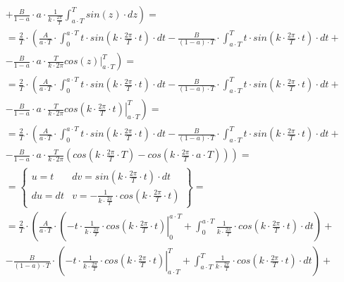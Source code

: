 \begin{task}
\begin{align*}
&+\left. \frac{B}{1-a}\cdot a \cdot \frac{1}{k \cdot \frac{2\pi}{T}} \int_{a \cdot T}^{T} sin\left(z\right) \cdot dz\right)=\\
&=\frac{2}{T}\cdot\left( \frac{A}{a \cdot T} \cdot \int_{0}^{a\cdot T} t \cdot sin\left( k \cdot \frac{2\pi}{T} \cdot t\right) \cdot dt -\frac{B}{\left(1-a\right)\cdot T}\cdot \int_{a \cdot T}^{T} t \cdot sin\left( k \cdot \frac{2\pi}{T} \cdot t\right) \cdot dt \right. +\\
&-\left. \frac{B}{1-a}\cdot a \cdot \frac{T}{k \cdot 2\pi} \left. cos\left(z\right) \right|_{a \cdot T}^{T}\right)=\\
&=\frac{2}{T}\cdot\left( \frac{A}{a \cdot T} \cdot \int_{0}^{a\cdot T} t \cdot sin\left( k \cdot \frac{2\pi}{T} \cdot t\right) \cdot dt -\frac{B}{\left(1-a\right)\cdot T}\cdot \int_{a \cdot T}^{T} t \cdot sin\left( k \cdot \frac{2\pi}{T} \cdot t\right) \cdot dt \right. +\\
&-\left. \frac{B}{1-a}\cdot a \cdot \frac{T}{k \cdot 2\pi} \left. cos\left(k \cdot \frac{2\pi}{T} \cdot t\right) \right|_{a \cdot T}^{T}\right)=\\
&=\frac{2}{T}\cdot\left( \frac{A}{a \cdot T} \cdot \int_{0}^{a\cdot T} t \cdot sin\left( k \cdot \frac{2\pi}{T} \cdot t\right) \cdot dt -\frac{B}{\left(1-a\right)\cdot T}\cdot \int_{a \cdot T}^{T} t \cdot sin\left( k \cdot \frac{2\pi}{T} \cdot t\right) \cdot dt \right. +\\
&-\left. \frac{B}{1-a}\cdot a \cdot \frac{T}{k \cdot 2\pi} \left( cos\left(k \cdot \frac{2\pi}{T} \cdot T\right) - cos\left(k \cdot \frac{2\pi}{T} \cdot a \cdot T\right) \right)\right)=\\
&=\left\{\begin{array}{ll}
u = t & dv = sin\left( k \cdot \frac{2\pi}{T} \cdot t\right) \cdot dt \\
du = dt & v = -\frac{1}{k \cdot \frac{2\pi}{T}} \cdot cos\left( k \cdot \frac{2\pi}{T} \cdot t\right)
\end{array}\right\}=\\
&=\frac{2}{T}\cdot\left( \frac{A}{a \cdot T} \cdot \left( \left. - t \cdot \frac{1}{k \cdot \frac{2\pi}{T}} \cdot cos\left( k \cdot \frac{2\pi}{T} \cdot t\right)
\right|_{0}^{a\cdot T} + \int_{0}^{a\cdot T} \frac{1}{k \cdot \frac{2\pi}{T}} \cdot cos\left( k \cdot \frac{2\pi}{T} \cdot t\right) \cdot dt\right) \right. + \\
&-\left.\frac{B}{\left(1-a\right)\cdot T}\cdot \left( \left. -t \cdot \frac{1}{k \cdot \frac{2\pi}{T}} \cdot cos\left( k \cdot \frac{2\pi}{T} \cdot t\right) \right|_{a \cdot T}^{T} + \int_{a \cdot T}^{T}  \frac{1}{k \cdot \frac{2\pi}{T}} \cdot cos\left( k \cdot \frac{2\pi}{T} \cdot t\right) \cdot dt \right)\right. +\\

\end{align*}
\end{task}
